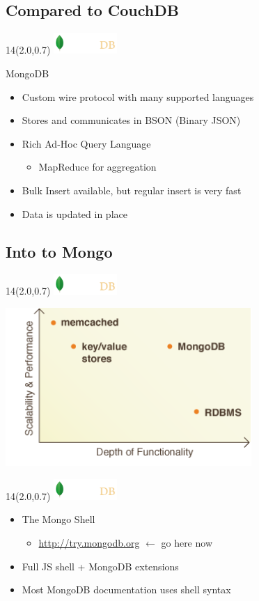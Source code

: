 \documentclass{beamer}
\newcommand{\MongoLogo}{
\begin{textblock}{14}(2.0,0.7)
  \includegraphics[height=0.8cm]{logo-mongodb-ondark.png}
\end{textblock}
}
\begin{document}
\subsection{Compared to CouchDB}
\begin{frame}[fragile]
  \MongoLogo

  \begin{block} {MongoDB}
    \begin{itemize}
      \item Custom wire protocol with many supported languages
      \item Stores and communicates in BSON (Binary JSON)
      \item Rich Ad-Hoc Query Language 
        \begin{itemize}
          \item MapReduce for aggregation
        \end{itemize}
      \item Bulk Insert available, but regular insert is very fast
      \item Data is updated in place
    \end{itemize}
  \end{block}
\end{frame}


\subsection{Into to Mongo}

\begin{frame}
  \MongoLogo
  \begin{center}
    \includegraphics[height=6cm]{featuresPerformance.png}
  \end{center}
\end{frame}

\begin{frame}[fragile]
  \MongoLogo
  \begin{itemize}
    \item The Mongo Shell
      \begin{itemize}
        \item \url{http://try.mongodb.org} ${\leftarrow}$ go here now
      \end{itemize}
    \item Full JS shell + MongoDB extensions
    \item Most MongoDB documentation uses shell syntax
  \end{itemize}
\end{frame}
\end{document}
